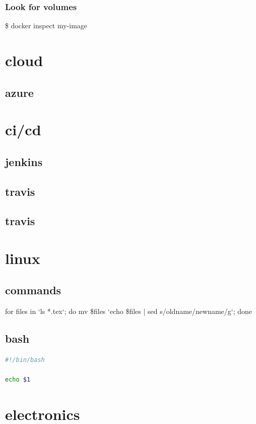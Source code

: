 \documentclass{report}
\begin{document}
\subsection{Look for volumes}
\begin{displayquote}
\$ docker inspect my-image \newline
\end{displayquote}


\chapter{cloud}
\section{azure}

\chapter{ci/cd}
\section{jenkins}
\section{travis}
\section{travis}

\chapter{linux}
\section{commands}
for files in `ls *.tex`; do mv \$files `echo \$files | sed s/oldname/newname/g`; done
\section{bash}
\begin{lstlisting}[language=sh]
#!/bin/bash

echo $1
\end{lstlisting}

\chapter{electronics}
\end{document}
